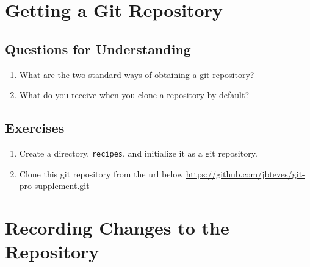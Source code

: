 \section{Getting a Git Repository}

\subsection{Questions for Understanding}
\begin{enumerate}
    \item What are the two standard ways of obtaining a git repository?
    \item What do you receive when you clone a repository by default?
\end{enumerate}

\subsection{Exercises}
\begin{enumerate}
    \item Create a directory, \verb+recipes+, and initialize it as a git
        repository.
    \item Clone this git repository from the url below
        \url{https://github.com/jbteves/git-pro-supplement.git}
\end{enumerate}

\section{Recording Changes to the Repository}


